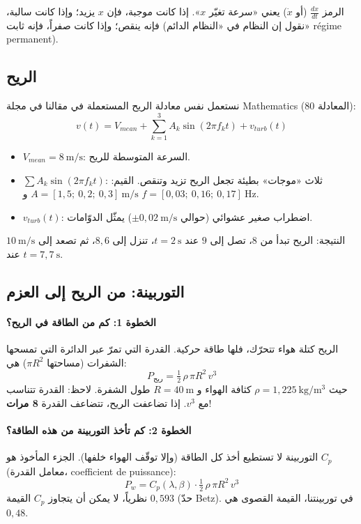 \documentclass[11pt,a4paper]{article}
\newcommand{\fr}[1]{\textfrench{#1}}
\begin{document}
الرمز $\frac{dx}{dt}$ (أو $\dot x$) يعني «سرعة تغيّر $x$». إذا كانت موجبة، فإن $x$ يزيد؛ وإذا كانت سالبة،
فإنه ينقص؛ وإذا كانت صفراً، فإنه ثابت (نقول إن النظام في «النظام الدائم» \fr{régime permanent}).

\subsection{الريح}
نستعمل نفس معادلة الريح المستعملة في مقالنا في مجلة \fr{Mathematics} (المعادلة 80):
\begin{equation}
v(t) = V_{mean} + \sum_{k=1}^{3} A_k \sin(2\pi f_k t) + v_{turb}(t)
\end{equation}
\begin{itemize}
\item $V_{mean}=8\ \mathrm{m/s}$: السرعة المتوسطة للريح.
\item $\sum A_k\sin(2\pi f_k t)$: ثلاث «موجات» بطيئة تجعل الريح تزيد وتنقص.
القيم: $A=[1{,}5;\ 0{,}2;\ 0{,}3]\ \mathrm{m/s}$ و $f=[0{,}03;\ 0{,}16;\ 0{,}17]\ \mathrm{Hz}$.
\item $v_{turb}(t)$: اضطراب صغير عشوائي (حوالي $\pm 0{,}02\ \mathrm{m/s}$) يمثّل الدوّامات.
\end{itemize}
النتيجة: الريح تبدأ من $8$، تصل إلى $9$ عند $t=2\ \mathrm{s}$، تنزل إلى $8{,}6$، ثم تصعد إلى $10\ \mathrm{m/s}$
عند $t=7{,}7\ \mathrm{s}$.

\subsection{التوربينة: من الريح إلى العزم}

\paragraph{الخطوة 1: كم من الطاقة في الريح؟}
الريح كتلة هواء تتحرّك، فلها طاقة حركية. القدرة التي تمرّ عبر الدائرة التي تمسحها الشفرات (مساحتها
$\pi R^2$) هي:
\begin{equation}
P_{\text{ريح}} = \tfrac12\,\rho\,\pi R^2\, v^3
\end{equation}
حيث $\rho=1{,}225\ \mathrm{kg/m^3}$ كثافة الهواء و $R=40\ \mathrm{m}$ طول الشفرة.
لاحظ: القدرة تتناسب مع $v^3$. إذا تضاعفت الريح، تتضاعف القدرة \textbf{8 مرات}!

\paragraph{الخطوة 2: كم تأخذ التوربينة من هذه الطاقة؟}
التوربينة لا تستطيع أخذ كل الطاقة (وإلا توقّف الهواء خلفها). الجزء المأخوذ هو $C_p$
(معامل القدرة، \fr{coefficient de puissance}):
\begin{equation}
P_w = C_p(\lambda,\beta)\cdot \tfrac12\,\rho\,\pi R^2\, v^3
\end{equation}
نظرياً، لا يمكن أن يتجاوز $C_p$ القيمة $0{,}593$ (حدّ \fr{Betz}). في توربينتنا، القيمة القصوى هي $0{,}48$.
\end{document}
